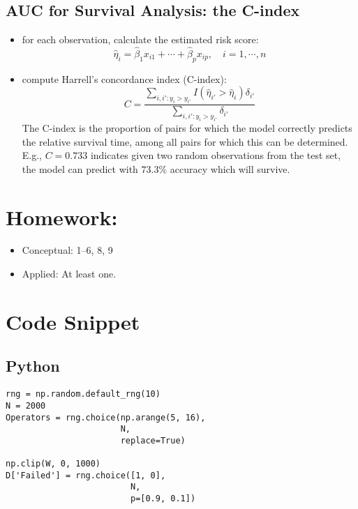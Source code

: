 \documentclass[
  letterpaper,
  DIV=11,
  numbers=noendperiod]{scrreprt}
\providecommand{\tightlist}{%
  \setlength{\itemsep}{0pt}\setlength{\parskip}{0pt}}\usepackage{longtable,booktabs,array}
\begin{document}
\subsection{AUC for Survival Analysis: the
C-index}\label{auc-for-survival-analysis-the-c-index}

\begin{itemize}
\tightlist
\item
  for each observation, calculate the estimated risk score: \[
  \hat{\eta}_i = \hat{\beta}_1x_{i1} +\cdots + \hat{\beta}_px_{ip}, \quad i=1, \cdots, n
  \]
\item
  compute Harrell's concordance index (C-index): \[
  C = \frac{\sum _{i,i':y_i>y_{i'}}I(\hat{\eta}_{i'} >\hat{\eta}_i) \delta_{i'}}{\sum _{i,i':y_i>y_{i'}}\delta_{i'}}
  \] The C-index is the proportion of pairs for which the model
  correctly predicts the relative survival time, among all pairs for
  which this can be determined. E.g., \(C=0.733\) indicates given two
  random observations from the test set, the model can predict with
  \(73.3\%\) accuracy which will survive.
\end{itemize}

\section{Homework:}\label{homework-7}

\begin{itemize}
\tightlist
\item
  Conceptual: 1--6, 8, 9
\item
  Applied: At least one.
\end{itemize}

\section{Code Snippet}\label{code-snippet-5}

\subsection{Python}\label{python-9}

\begin{verbatim}
rng = np.random.default_rng(10)
N = 2000
Operators = rng.choice(np.arange(5, 16),
                       N,
                       replace=True)
                       
np.clip(W, 0, 1000)
D['Failed'] = rng.choice([1, 0],
                         N,
                         p=[0.9, 0.1])
\end{verbatim}
\end{document}
